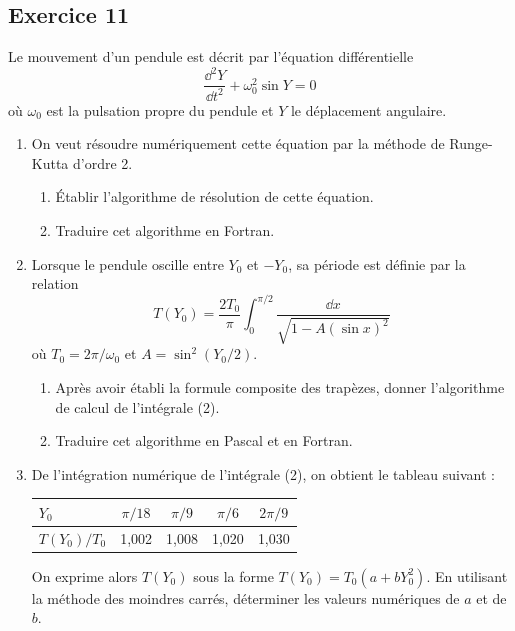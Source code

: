 \subsection*{Exercice 11}

Le mouvement d'un pendule est décrit par l'équation différentielle
\[
  \frac{\dd^2 Y}{\dd t^2} + \omega_0^2\sin Y = 0
\]
où $\omega_0$ est la pulsation propre du pendule et $Y$ le déplacement
angulaire.
\begin{enumerate}[label=\arabic*-]
  \item On veut résoudre numériquement cette équation par la méthode de
        Runge-Kutta d'ordre 2.
        \begin{enumerate}[label=\alph*-]
          \item Établir l'algorithme de résolution de cette équation.
          \item Traduire cet algorithme en Fortran.
        \end{enumerate}
  \item Lorsque le pendule oscille entre $Y_0$ et $-Y_0$, sa période est
        définie par la relation
        \begin{equation}
          T(Y_0) = \frac{2T_0}{\pi}\int_0^{\pi/2}\frac{\dd x}{\sqrt{1 - A(\sin x)^2}}
          \tag{2}
        \end{equation}
        où $T_0 = 2\pi/\omega_0$ et $A = \sin^2(Y_0/2)$.
        \begin{enumerate}[label=\alph*-]
          \item Après avoir établi la formule composite des trapèzes, donner
                l'algorithme de calcul de l'intégrale (2).
          \item Traduire cet algorithme en Pascal et en Fortran.
        \end{enumerate}
  \item De l'intégration numérique de l'intégrale (2), on obtient le tableau
        suivant :
        \begin{center}
          \begin{tabular}{|l|c|c|c|c|}
            \hline
            $Y_0$ & $\pi/18$ & $\pi/9$ & $\pi/6$ & $2\pi/9$\\ \hline
            $T(Y_0)/T_0$ & 1,002 & 1,008 & 1,020 & 1,030\\ \hline
          \end{tabular}
        \end{center}
        On exprime alors $T(Y_0)$ sous la forme $T(Y_0) = T_0(a + bY_0^2)$. En
        utilisant la méthode des moindres carrés, déterminer les valeurs
        numériques de $a$ et de $b$.
\end{enumerate}

